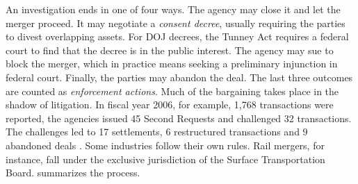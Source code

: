 An investigation ends in one of four ways. The agency may close it and let the merger proceed. It may negotiate
a \emph{consent decree}, usually requiring the parties to divest overlapping assets. For DOJ decrees, the Tunney
Act requires a federal court to find that the decree is in the public interest. The agency may sue to block the
merger, which in practice means seeking a preliminary injunction in federal court. Finally, the parties may
abandon the deal. The last three outcomes are counted as \emph{enforcement actions}. Much of the bargaining takes
place in the shadow of litigation. In fiscal year 2006, for example, 1,768 transactions were reported, the
agencies issued 45 Second Requests and challenged 32 transactions. The challenges led to 17 settlements, 6
restructured transactions and 9 abandoned deals \citep[p.~2, n.~5]{FarrellShapiro2010}. Some industries follow
their own rules. Rail mergers, for instance, fall under the exclusive jurisdiction of the Surface Transportation
Board.  summarizes the process.

